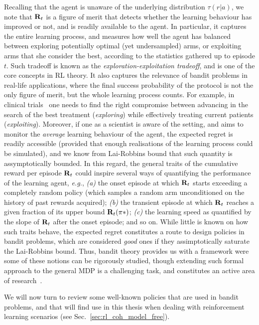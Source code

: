 Recalling that the agent is unaware of the underlying distribution $\tau(r|a)$, we note that $\mathbf{R}_{t}$ is a figure of merit that detects whether the learning behaviour has improved or not, and is readily available to the agent. In particular, it captures the entire learning process, and measures how well the agent has balanced between exploring potentially optimal (yet undersampled) arms, or exploiting arms that she consider the best, according to the statistics gathered up to episode $t$. Such tradeoff is known as the \textit{exploration-exploitation tradeoff}, and is one of the core concepts in RL theory. It also captures the relevance of bandit problems in real-life applications, where the final success probability of the protocol is not the only figure of merit, but the whole learning process counts. For example, in clinical trials~\cite{Thompson1933} one needs to find the right compromise between advancing in the search of the best treatment (\textit{exploring}) while effectively treating current patients (\textit{exploiting}). Moreover, if one as a scientist is aware of the setting, and aims to monitor the \textit{average} learning behaviour of the agent, the expected regret is readily accessible (provided that enough realisations of the learning process could be simulated), and we know from Lai-Robbins bound that such quantity is assymptotically bounded.
In this regard, the general traits of the cumulative reward per episode $\mathbf{R}_{t}$ could inspire several ways of quantifying the performance of the learning agent, \textit{e.g.}, \textit{(a)} the onset episode at which $\mathbf{R}_{t}$ starts exceeding a completely random policy (which samples a random arm unconditioned on the history of past rewards acquired); \textit{(b)} the transient episode at which $\mathbf{R}_{t}$ reaches a given fraction of its upper bound $\mathbf{R}_{t}(\pi*)$;  \textit{(c)} the learning speed as quantified by the slope of $\mathbf{R}_{t}$ after the onset episode; and so on. While little is known on how such traits behave, the expected regret constitutes a route to design policies in bandit problems, which are considered \textit{good} ones if they assimptotically saturate the Lai-Robbins bound. Thus, bandit theory provides us with a framework were some of these notions can be rigorously studied, though extending such formal approach to the general MDP is a challenging task, and constitutes an active area of research~\cite{banditbook, regRL1, regRL2, thesisRegret, QlearningUCB}.%

We will now turn to review some well-known policies that are used in bandit problems, and that will find use in this thesis when dealing with reinforcement learning scenarios (see Sec.~\ref{sec:rl_coh_model_free}).

